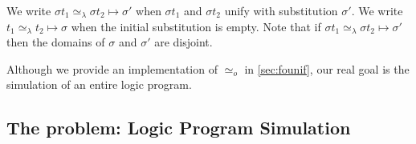 \documentclass[sigconf,natbib=false,review]{acmart}
\newcommand{\EqualRel}{\ensuremath{=}}
\newcommand{\UnifRel}{\ensuremath{\simeq}}
\newcommand{\Uo}{\ensuremath{\UnifRel_o}\xspace}
\newcommand{\Eo}{\ensuremath{\EqualRel_o}\xspace}
\newcommand{\Ue}{\ensuremath{\UnifRel_\lambda}\xspace}
\newcommand{\Ee}{\ensuremath{\EqualRel_\lambda}\xspace}
\newcommand{\Fo}{\ensuremath{\mathcal{F}_{\!o}\xspace}} %
\newcommand{\Ho}{\ensuremath{\mathcal{H}_o}\xspace}
\begin{document}
%

We write 
$\sigma t_1 \Ue \sigma t_2 \mapsto \sigma'$ when
$\sigma t_1$ and $\sigma t_2$ unify with substitution $\sigma'$.
We write $t_1 \Ue t_2 \mapsto \sigma$ when
the initial substitution is empty.
Note that if $\sigma t_1 \Ue \sigma t_2 \mapsto \sigma'$ then
the domains of $\sigma$ and $\sigma'$ are disjoint.

Although we provide an implementation of \Uo{} in \cref{sec:founif},
our real goal is the simulation of an entire logic program.

\subsection{The problem: Logic Program Simulation}
\end{document}
